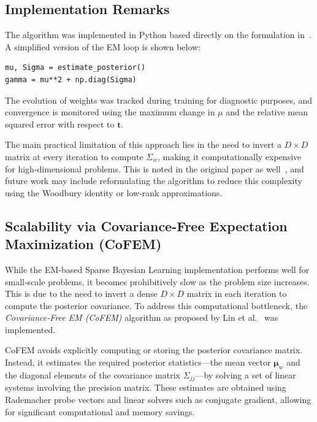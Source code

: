 \documentclass{article}
\begin{document}
\subsection{Implementation Remarks}

The algorithm was implemented in Python based directly on the formulation in~\cite{wipf2004sparse}. A simplified version of the EM loop is shown below:

\begin{verbatim}
mu, Sigma = estimate_posterior()
gamma = mu**2 + np.diag(Sigma)
\end{verbatim}

The evolution of weights was tracked during training for diagnostic purposes, and convergence is monitored using the maximum change in $\mu$ and the relative mean squared error with respect to $\mathbf{t}$.

The main practical limitation of this approach lies in the need to invert a $D \times D$ matrix at every iteration to compute $\Sigma_w$, making it computationally expensive for high-dimensional problems. This is noted in the original paper as well~\cite[p.~2155]{wipf2004sparse}, and future work may include reformulating the algorithm to reduce this complexity using the Woodbury identity or low-rank approximations.

\subsection{Scalability via Covariance-Free Expectation Maximization (CoFEM)}

While the EM-based Sparse Bayesian Learning implementation performs well for small-scale problems, it becomes prohibitively slow as the problem size increases. This is due to the need to invert a dense $ D \times D $ matrix in each iteration to compute the posterior covariance. To address this computational bottleneck, the \emph{Covariance-Free EM (CoFEM)} algorithm as proposed by Lin et al.~\cite{lin2022covariance} was implemented.

CoFEM avoids explicitly computing or storing the posterior covariance matrix. Instead, it estimates the required posterior statistics—the mean vector $ \boldsymbol{\mu}_w $ and the diagonal elements of the covariance matrix $ \Sigma_{jj} $—by solving a set of linear systems involving the precision matrix. These estimates are obtained using Rademacher probe vectors and linear solvers such as conjugate gradient, allowing for significant computational and memory savings.
\end{document}
